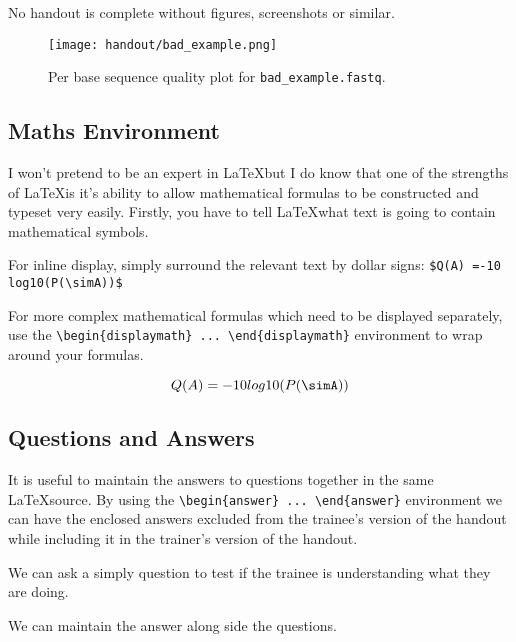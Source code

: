 No handout is complete without figures, screenshots or similar.

\begin{figure}[H]
\centering
\texttt{[image: handout/bad\_example.png]}
\caption{Per base sequence quality plot for \texttt{bad\_example.fastq}.}
\label{fig:bad_example_untrimmed_plot}
\end{figure}

\subsection{Maths Environment}

I won't pretend to be an expert in \LaTeX but I do know that one of the strengths of \LaTeX is it's
ability to allow mathematical formulas to be constructed and typeset very easily. Firstly, you have
to tell \LaTeX what text is going to contain mathematical symbols.

For inline display, simply surround the relevant text by dollar signs: \verb+$Q(A) =-10 log10(P(\simA))$+

For more complex mathematical formulas which need to be displayed separately, use the
\verb+\begin{displaymath} ... \end{displaymath}+ environment to wrap around your formulas.

\begin{displaymath}
Q(A) =-10 log10(P(\simA))
\end{displaymath} 


\subsection{Questions and Answers}

It is useful to maintain the answers to questions together in the same \LaTeX source. By using the
\verb+\begin{answer} ... \end{answer}+ environment we can have the enclosed answers excluded from
the trainee's version of the handout while including it in the trainer's version of the handout.

\begin{questions}
We can ask a simply question to test if the trainee is understanding what they are doing. 
\begin{answer}
We can maintain the answer along side the questions.
\end{answer}

\end{questions}

